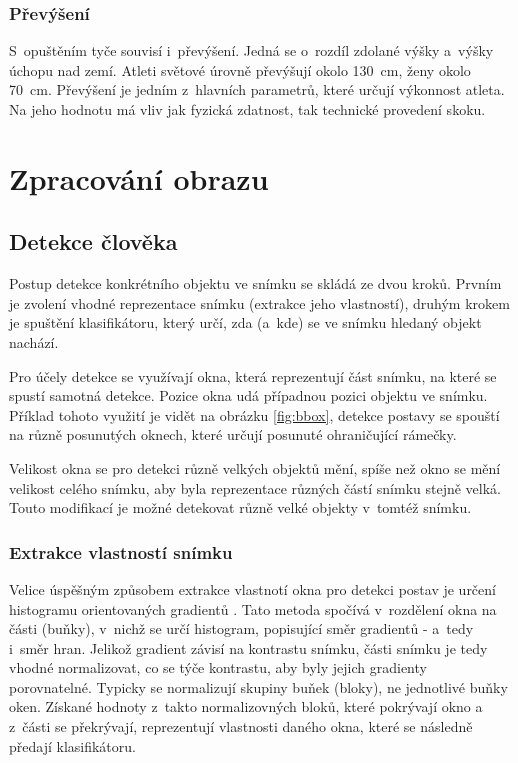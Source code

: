\subsubsection{Převýšení}

S~opuštěním tyče souvisí i~převýšení. Jedná se o~rozdíl zdolané výšky a~výšky úchopu nad zemí. Atleti světové úrovně převýšují okolo 130~cm, ženy okolo 70~cm. Převýšení je jedním z~hlavních parametrů, které určují výkonnost atleta. Na jeho hodnotu má vliv jak fyzická zdatnost, tak technické provedení skoku.




\section{Zpracování obrazu}



\subsection{Detekce člověka}

Postup detekce konkrétního objektu ve snímku se skládá ze dvou kroků. Prvním je zvolení vhodné reprezentace snímku (extrakce jeho vlastností), druhým krokem je spuštění klasifikátoru, který určí, zda (a~kde) se ve snímku hledaný objekt nachází.

Pro účely detekce se využívají okna, která reprezentují část snímku, na které se spustí samotná detekce. Pozice okna udá případnou pozici objektu ve snímku. Příklad tohoto využití je vidět na obrázku \ref{fig:bbox}, detekce postavy se spouští na různě posunutých oknech, které určují posunuté ohraničující rámečky.

Velikost okna se pro detekci různě velkých objektů mění, spíše než okno se mění velikost celého snímku, aby byla reprezentace různých částí snímku stejně velká. Touto modifikací je možné detekovat různě velké objekty v~tomtéž snímku.


\subsubsection{Extrakce vlastností snímku}

Velice úspěšným způsobem extrakce vlastnotí okna pro detekci postav je určení histogramu orientovaných gradientů \citep{HOG}. Tato metoda spočívá v~rozdělení okna na části (buňky), v~nichž se určí histogram, popisující směr gradientů - a~tedy i~směr hran. Jelikož gradient závisí na kontrastu snímku, části snímku je tedy vhodné normalizovat, co se týče kontrastu, aby byly jejich gradienty porovnatelné. Typicky se normalizují skupiny buňek (bloky), ne jednotlivé buňky oken. Získané hodnoty z~takto normalizovných bloků, které pokrývají okno a z~části se překrývají, reprezentují vlastnosti daného okna, které se následně předají klasifikátoru.

